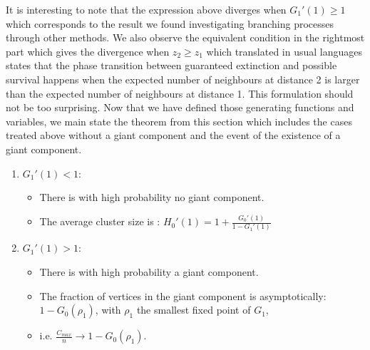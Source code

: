 It is interesting to note that the expression above diverges when $G_1'(1) \geq 1$ which corresponds to the result we found investigating branching processes through other methods.
We also observe the equivalent condition in the rightmost part which gives the divergence when $z_2 \geq z_1$ which translated in usual languages states that the phase transition between guaranteed extinction and possible survival happens when the expected number of neighbours at distance 2 is larger than the expected number of neighbours at distance 1.
This formulation should not be too surprising.
\newline
Now that we have defined those generating functions and variables, we main state the theorem from this section which includes the cases treated above without a giant component and the event of the existence of a giant component.
\begin{theorem}\label{th:NWS}
	\begin{enumerate}
		\item  $G_1'(1) < 1$:
			\begin{itemize}
				\item	There is with high probability no giant component.
				\item	The average cluster size is : $H_0'(1) = 1 + \frac{G_0'(1)}{1 - G_1'(1)}$
			\end{itemize}
		\item	$G_1'(1) > 1$:
			\begin{itemize}
				\item	There is with high probability a giant component.
				\item	The fraction of vertices in the giant component is asymptotically: $1-G_0(\rho_1)$, with $\rho_1$ the smallest fixed point of $G_1$,
				\item	i.e. $\frac{C_{max}}{n} \longrightarrow 1 - G_0(\rho_1)$.
			\end{itemize}
	\end{enumerate}
\end{theorem}
